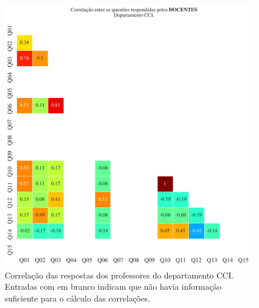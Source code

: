 \documentclass[a4paper,10pt]{article}
\begin{document}
\begin{figure}[h]
\centering
\includegraphics[width=0.999\linewidth]{matriz_corr__CCI_docentes.png}
\caption{\label{fig:corr_docentes}Correlação das respostas dos professores do departamento CCI. Entradas com em branco indicam que não havia informação suficiente para o cálculo das correlações.}
\end{figure}
\end{document}
